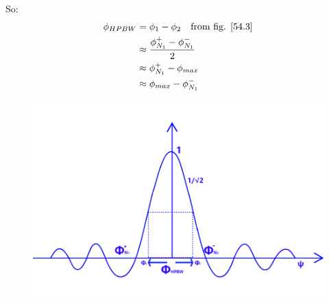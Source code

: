 So:
\begin{equation}
\begin{split}
\phi_{HPBW} &= \phi_{1}  - \phi_{2}\quad \text{from fig. \ref{54.3}}\\
&\approx \frac{\phi^+_{N_1} - \phi^-_{N_1}}{2} \\
& \approx \phi^+_{N_1} - \phi_{max} \\
& \approx \phi_{max} - \phi^-_{N_1}
\end{split}
\end{equation}

\begin{figure}[h]
\centering
\includegraphics[width=1\linewidth]{./graphics/fig54_3}
\caption{}
\label{54.3}
\end{figure}

